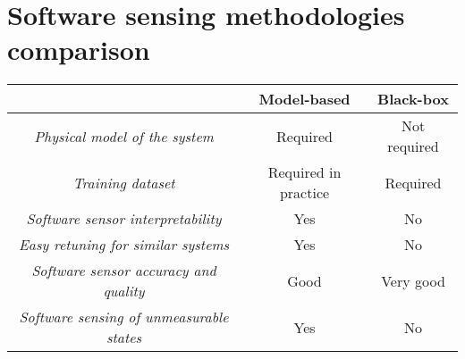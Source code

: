\section{Software sensing methodologies comparison}

\begin{table}[H]
    \centering
    \begin{tabular}{c|c|c|}
    \cline{2-3}
                                                                           & \textbf{Model-based}                       & \textbf{Black-box} \\ \hline
    \multicolumn{1}{|c|}{\textit{Physical model of the system}}            & Required                                   & Not required       \\
    \multicolumn{1}{|c|}{\textit{Training dataset}}                        & Required in practice                       & Required           \\
    \multicolumn{1}{|c|}{\textit{Software sensor interpretability}}        & Yes                                        & No                 \\
    \multicolumn{1}{|c|}{\textit{Easy retuning for similar systems}}       & Yes                                        & No                 \\
    \multicolumn{1}{|c|}{\textit{Software sensor accuracy and quality}}    & Good                                       & Very good          \\
    \multicolumn{1}{|c|}{\textit{Software sensing of unmeasurable states}} & Yes                                        & No                 \\ \hline
    \end{tabular}
\end{table}